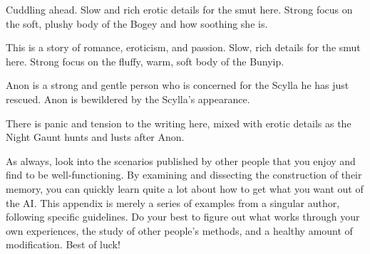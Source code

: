 \documentclass[Coomer-main.tex]{subfiles}
\begin{document}
\begin{/an}
Cuddling ahead.
Slow and rich erotic details for the smut here.
Strong focus on the soft, plushy body of the Bogey and how soothing she is.
\end{/an}

\begin{/an}
This is a story of romance, eroticism, and passion.
Slow, rich details for the smut here.
Strong focus on the fluffy, warm, soft body of the Bunyip.
\end{/an}

\begin{/an}
Anon is a strong and gentle person who is concerned for the Scylla he has just rescued.
Anon is bewildered by the Scylla's appearance.
\end{/an}

\begin{/an}
There is panic and tension to the writing here, mixed with erotic details as the Night Gaunt hunts and lusts after Anon.
\end{/an}

As always, look into the scenarios published by other people that you enjoy and find to be well-functioning.
By examining and dissecting the construction of their memory, you can quickly learn quite a lot about how to get what you want out of the AI.
This appendix is merely a series of examples from a singular author, following specific guidelines.
Do your best to figure out what works through your own experiences, the study of other people’s methods, and a healthy amount of modification.
Best of luck!
\end{document}
